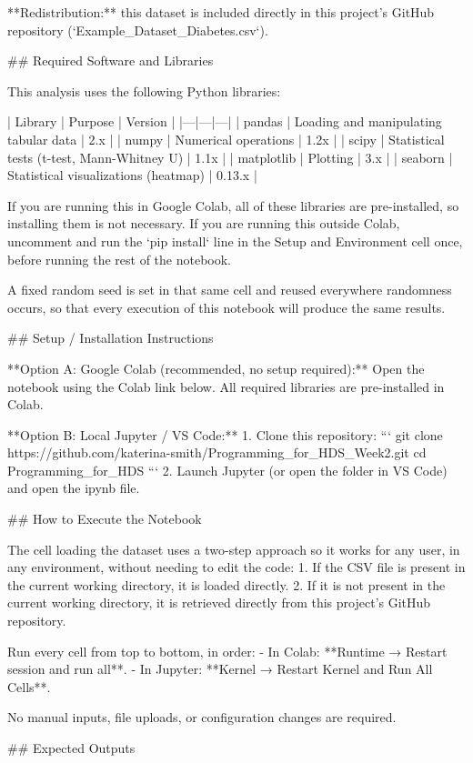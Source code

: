 **Redistribution:** this dataset is included directly in this project's GitHub
repository (`Example_Dataset_Diabetes.csv`).

## Required Software and Libraries

This analysis uses the following Python libraries:

| Library | Purpose | Version |
|---|---|---|
| pandas | Loading and manipulating tabular data | 2.x |
| numpy | Numerical operations | 1.2x |
| scipy | Statistical tests (t-test, Mann-Whitney U) | 1.1x |
| matplotlib | Plotting | 3.x |
| seaborn | Statistical visualizations (heatmap) | 0.13.x |

If you are running this in Google Colab, all of these libraries are pre-installed,
so installing them is not necessary. If you are running this outside Colab,
uncomment and run the `pip install` line in the Setup and Environment cell once,
before running the rest of the notebook.

A fixed random seed is set in that same cell and reused everywhere randomness
occurs, so that every execution of this notebook will produce the same results.

## Setup / Installation Instructions

**Option A: Google Colab (recommended, no setup required):**
Open the notebook using the Colab link below. All required libraries are
pre-installed in Colab.

**Option B: Local Jupyter / VS Code:**
1. Clone this repository:
   ```
   git clone https://github.com/katerina-smith/Programming_for_HDS_Week2.git
   cd Programming_for_HDS
   ```
2. Launch Jupyter (or open the folder in VS Code) and open the ipynb file.

## How to Execute the Notebook

The cell loading the dataset uses a two-step approach so it works for any user,
in any environment, without needing to edit the code:
1. If the CSV file is present in the current working directory, it is loaded
   directly.
2. If it is not present in the current working directory, it is retrieved
   directly from this project's GitHub repository.

Run every cell from top to bottom, in order:
- In Colab: **Runtime → Restart session and run all**.
- In Jupyter: **Kernel → Restart Kernel and Run All Cells**.

No manual inputs, file uploads, or configuration changes are required.

## Expected Outputs

